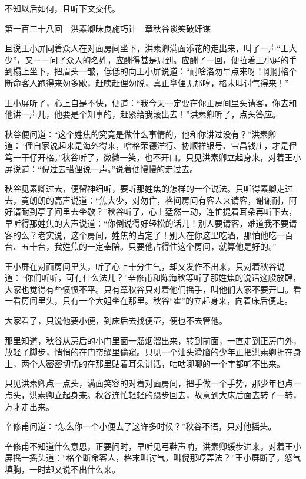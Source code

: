 \documentclass[12pt,UTF8]{ctexbook}
\begin{document}
{{{不知以后如何，且听下文交代。





第一百三十八回　洪素卿昧良施巧计　章秋谷谈笑破奸谋





且说王小屏同着众人在对面房间坐下，洪素卿满面添花的走出来，叫了一声“王大少”，又一一问了众人的名姓，应酬得甚是周到。应酬了一回，便拉着王小屏的手到榻上坐下，把眉头一皱，低低的向王小屏说道：“耐啥洛勿早点来呀！刚刚格个断命客人跑得来勿多歇，赶咦赶俚勿脱，真正拿俚无那哼，格末叫讨气得来！”

王小屏听了，心上自是不快，便道：“我今天一定要在你正房间里头请客，你去和他讲一声儿，他要是个知事的，赶紧给我滚出去！”洪素卿听了，点头答应。

秋谷便问道：“这个姓焦的究竟是做什么事情的，他和你讲过没有？”洪素卿道：“俚自家说起来是海外得来，啥格荣德洋行、协顺祥银号、宝昌钱庄，才是俚笃一干仔开格。”秋谷听了，微微一笑，也不开口。只见洪素卿立起身来，对着王小屏说道：“倪过去搭俚说一声。”说着便慢慢的走过去。

秋谷见素卿过去，便留神细听，要听那姓焦的怎样的一个说法。只听得素卿走过去，竟朗朗的高声说道：“焦大少，对勿住，格间房间有客人来请客，谢谢耐，阿好请耐到亭子间里去坐歇？”秋谷听了，心上猛然一动，连忙提着耳朵再听下去，早听得那姓焦的大声说道：“你倒说得好轻松的话儿！别人要请客，难道我不要请客的么？老实说，这个房间，姓焦的占定了！别人在你这里吃酒，那怕他吃一百台、五十台，我姓焦的一定奉陪。只要他占得住这个房间，就算他是好的。”

王小屏在对面房间里头，听了心上十分生气，却又发作不出来，只对着秋谷说道：“你们听听，可有什么法儿？”辛修甫和陈海秋等听了那姓焦的说话这般放肆，大家也觉得有些愤愤不平。只有章秋谷只对着他们摇手，叫他们大家不要开口。看一看房间里头，只有一个大姐坐在那里。秋谷“霍”的立起身来，向着床后便走。

大家看了，只说他要小便，到床后去找便壶，便也不去管他。

那里知道，秋谷从房后的小门里面一溜烟溜出来，转到前面，一直走到正房门外，放轻了脚步，悄悄的在门帘缝里偷窥。只见一个油头滑脑的少年正把洪素卿拥在身上，两个人密密切切的在那里贴着耳朵讲话，咕咕唧唧的一个字都听不出来。

只见洪素卿点一点头，满面笑容的对着对面房间，把手做一个手势，那少年也点一点头，洪素卿立起身来。秋谷连忙轻轻的蹑步回去，故意到大床后面去转了一转，方才走出来。

辛修甫问道：“怎么你一个小便去了这许多时候？”秋谷不语，只对他摇头。

辛修甫不知道什么意思，正要问时，早听见弓鞋声响，洪素卿缓步进来，对着王小屏摇一摇头道：“格个断命客人，格末叫讨气，叫倪那哼弄法？”王小屏断了，怒气填胸，一时却又说不出什么来。

}}}
\end{document}
